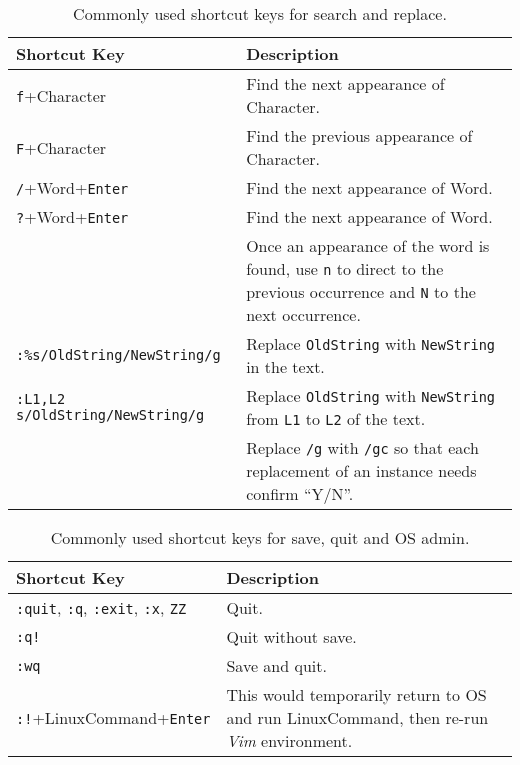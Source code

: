 \documentclass[a4paper]{article}
\begin{document}
\begin{table}
  \centering \caption{Commonly used shortcut keys for search and replace.}\label{tab:SKeySearchReplace}
  \begin{tabularx}{\textwidth}{lX}
    \hline
    Shortcut Key & Description \\ \hline
    \texttt{f}+Character  & Find the next appearance of Character. \\ \hdashline
    \texttt{F}+Character  & Find the previous appearance of Character. \\ \hdashline
    \texttt{/}+Word+\texttt{Enter}  & Find the next appearance of Word. \\ \hdashline
    \texttt{?}+Word+\texttt{Enter}  & Find the next appearance of Word. \\ \hdashline
    & Once an appearance of the word is found, use \texttt{n} to direct to the previous occurrence and \texttt{N} to the next occurrence. \\ \hdashline
    \texttt{:\%s/OldString/NewString/g}  & Replace \texttt{OldString} with \texttt{NewString} in the text. \\ \hdashline
    \texttt{:L1,L2 s/OldString/NewString/g}  & Replace \texttt{OldString} with \texttt{NewString} from \texttt{L1} to \texttt{L2} of the text. \\ \hdashline
    & Replace \texttt{/g} with \texttt{/gc} so that each replacement of an instance needs confirm ``Y/N''. \\
    \hline
  \end{tabularx}
\end{table}

\begin{table}
  \centering \caption{Commonly used shortcut keys for save, quit and OS admin.}\label{tab:SKeySaveQuit}
  \begin{tabularx}{\textwidth}{lX}
    \hline
    Shortcut Key & Description \\ \hline
    \texttt{:quit}, \texttt{:q}, \texttt{:exit}, \texttt{:x}, \texttt{ZZ} & Quit. \\ \hdashline
    \texttt{:q!} & Quit without save. \\ \hdashline
    \texttt{:wq} & Save and quit. \\ \hdashline
    \texttt{:!}+LinuxCommand+\texttt{Enter} & This would temporarily return to OS and run LinuxCommand, then re-run \textit{Vim} environment. \\
    \hline
  \end{tabularx}
\end{table}
\end{document}
